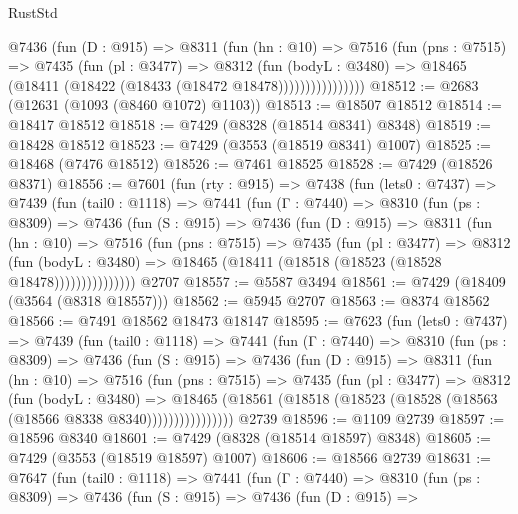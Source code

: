 \begin{lexlean}{RustStd}
\begin{coremodule}
                @7436
                  (fun (D : @915) =>
                  @8311
                    (fun (hn : @10) =>
                    @7516
                      (fun (pns : @7515) =>
                      @7435
                        (fun (pl : @3477) =>
                        @8312
                          (fun (bodyL : @3480) =>
                          @18465 (@18411 (@18422 (@18433 (@18472 @18478))))))))))))))))
@18512 := @2683 (@12631 (@1093 (@8460 @1072) @1103))
@18513 := @18507 @18512
@18514 := @18417 @18512
@18518 := @7429 (@8328 (@18514 @8341) @8348)
@18519 := @18428 @18512
@18523 := @7429 (@3553 (@18519 @8341) @1007)
@18525 := @18468 (@7476 @18512)
@18526 := @7461 @18525
@18528 := @7429 (@18526 @8371)
@18556 := @7601
    (fun (rty : @915) =>
    @7438
      (fun (lets0 : @7437) =>
      @7439
        (fun (tail0 : @1118) =>
        @7441
          (fun (Γ : @7440) =>
          @8310
            (fun (ps : @8309) =>
            @7436
              (fun (S : @915) =>
              @7436
                (fun (D : @915) =>
                @8311
                  (fun (hn : @10) =>
                  @7516
                    (fun (pns : @7515) =>
                    @7435
                      (fun (pl : @3477) =>
                      @8312
                        (fun (bodyL : @3480) =>
                        @18465 (@18411 (@18518 (@18523 (@18528 @18478)))))))))))))))
    @2707
@18557 := @5587 @3494
@18561 := @7429 (@18409 (@3564 (@8318 @18557)))
@18562 := @5945 @2707
@18563 := @8374 @18562
@18566 := @7491 @18562 @18473 @18147
@18595 := @7623
    (fun (lets0 : @7437) =>
    @7439
      (fun (tail0 : @1118) =>
      @7441
        (fun (Γ : @7440) =>
        @8310
          (fun (ps : @8309) =>
          @7436
            (fun (S : @915) =>
            @7436
              (fun (D : @915) =>
              @8311
                (fun (hn : @10) =>
                @7516
                  (fun (pns : @7515) =>
                  @7435
                    (fun (pl : @3477) =>
                    @8312
                      (fun (bodyL : @3480) =>
                      @18465
                        (@18561 (@18518 (@18523 (@18528 (@18563 (@18566 @8338 @8340))))))))))))))))
    @2739
@18596 := @1109 @2739
@18597 := @18596 @8340
@18601 := @7429 (@8328 (@18514 @18597) @8348)
@18605 := @7429 (@3553 (@18519 @18597) @1007)
@18606 := @18566 @2739
@18631 := @7647
    (fun (tail0 : @1118) =>
    @7441
      (fun (Γ : @7440) =>
      @8310
        (fun (ps : @8309) =>
        @7436
          (fun (S : @915) =>
          @7436
            (fun (D : @915) =>

\end{coremodule}
\end{lexlean}
